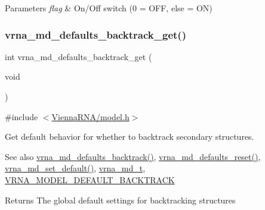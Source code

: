 \begin{DoxyParams}{Parameters}
{\em flag} & On/\+Off switch (0 = O\+FF, else = ON) \\
\hline
\end{DoxyParams}
\mbox{\label{group__model__details_ga90da1156e6883ddd68527c2830706648}} 
\subsubsection{\texorpdfstring{vrna\+\_\+md\+\_\+defaults\+\_\+backtrack\+\_\+get()}{vrna\_md\_defaults\_backtrack\_get()}}
{\footnotesize\ttfamily int vrna\+\_\+md\+\_\+defaults\+\_\+backtrack\+\_\+get (\begin{DoxyParamCaption}\item[{void}]{ }\end{DoxyParamCaption})}



{\ttfamily \#include $<$\hyperlink{model_8h}{Vienna\+R\+N\+A/model.\+h}$>$}



Get default behavior for whether to backtrack secondary structures. 

\begin{DoxySeeAlso}{See also}
\hyperlink{group__model__details_ga978c468b2fe96a70d5191e3dd17d5599}{vrna\+\_\+md\+\_\+defaults\+\_\+backtrack()}, \hyperlink{group__model__details_ga70834424cf804d149937de89f80ceb45}{vrna\+\_\+md\+\_\+defaults\+\_\+reset()}, \hyperlink{group__model__details_ga8ac6ff84936282436f822644bf841f66}{vrna\+\_\+md\+\_\+set\+\_\+default()}, \hyperlink{group__model__details_ga1f8a10e12a0a1915f2a4eff0b28ea17c}{vrna\+\_\+md\+\_\+t}, \hyperlink{group__model__details_ga3fda8006ab84baf817bd8e5ccbc6bb35}{V\+R\+N\+A\+\_\+\+M\+O\+D\+E\+L\+\_\+\+D\+E\+F\+A\+U\+L\+T\+\_\+\+B\+A\+C\+K\+T\+R\+A\+CK} 
\end{DoxySeeAlso}
\begin{DoxyReturn}{Returns}
The global default settings for backtracking structures 
\end{DoxyReturn}
\mbox{\label{group__model__details_ga68305274de96b56b7799575e222560d8}} 
